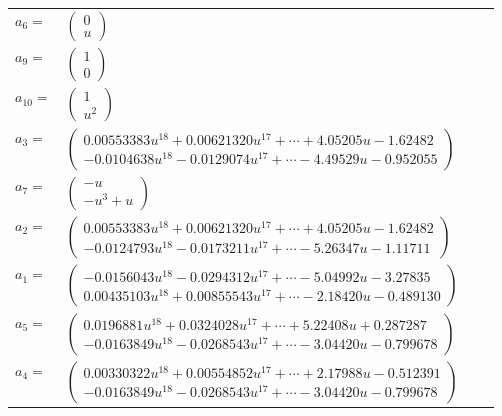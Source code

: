 \documentclass[1p]{elsarticle_modified}
\theoremstyle{definition}
\begin{document}
\begin{tabular}{m{7pt} m{180pt} m{7pt} m{180pt} }
\flushright $a_{6}=$&$\begin{pmatrix}0\\u\end{pmatrix}$ \\
\flushright $a_{9}=$&$\begin{pmatrix}1\\0\end{pmatrix}$ \\
\flushright $a_{10}=$&$\begin{pmatrix}1\\u^2\end{pmatrix}$ \\
\flushright $a_{3}=$&$\begin{pmatrix}0.00553383 u^{18}+0.00621320 u^{17}+\cdots+4.05205 u-1.62482\\-0.0104638 u^{18}-0.0129074 u^{17}+\cdots-4.49529 u-0.952055\end{pmatrix}$ \\
\flushright $a_{7}=$&$\begin{pmatrix}- u\\- u^3+u\end{pmatrix}$ \\
\flushright $a_{2}=$&$\begin{pmatrix}0.00553383 u^{18}+0.00621320 u^{17}+\cdots+4.05205 u-1.62482\\-0.0124793 u^{18}-0.0173211 u^{17}+\cdots-5.26347 u-1.11711\end{pmatrix}$ \\
\flushright $a_{1}=$&$\begin{pmatrix}-0.0156043 u^{18}-0.0294312 u^{17}+\cdots-5.04992 u-3.27835\\0.00435103 u^{18}+0.00855543 u^{17}+\cdots-2.18420 u-0.489130\end{pmatrix}$ \\
\flushright $a_{5}=$&$\begin{pmatrix}0.0196881 u^{18}+0.0324028 u^{17}+\cdots+5.22408 u+0.287287\\-0.0163849 u^{18}-0.0268543 u^{17}+\cdots-3.04420 u-0.799678\end{pmatrix}$ \\
\flushright $a_{4}=$&$\begin{pmatrix}0.00330322 u^{18}+0.00554852 u^{17}+\cdots+2.17988 u-0.512391\\-0.0163849 u^{18}-0.0268543 u^{17}+\cdots-3.04420 u-0.799678\end{pmatrix}$ \\

\end{tabular}
\end{document}
